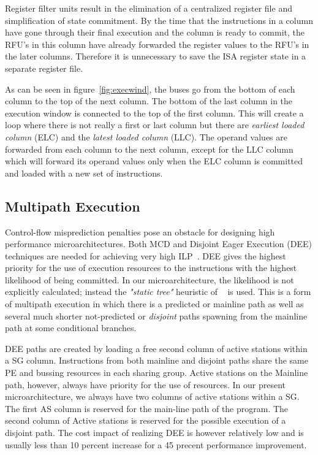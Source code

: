 \documentclass[10pt,twocolumn]{IEEEtran}
\begin{document}
Register filter units result in the elimination of a centralized
register file and simplification of state commitment.  By the time that
the instructions in a column have gone through their final execution
and the column is ready to commit, the RFU's in this column have
already forwarded the register values to the RFU's in the later
columns.  Therefore it is unnecessary to save the ISA register state in
a separate register file.

As can be seen in figure~\ref{fig:execwind}, the buses go from the
bottom of each column to the top of the next column.  The bottom of the
last column in the execution window is connected to the top of the
first column.  This will create a loop where there is not really a
first or last column but there are \emph{earliest loaded column} (ELC)
and the \emph{latest loaded column} (LLC).  The operand values are
forwarded from each column to the next column, except for the LLC
column which will forward its operand values only when the ELC column
is committed and loaded with a new set of instructions.

\subsection {Multipath Execution}

Control-flow misprediction penalties pose an obstacle for designing
high performance microarchitectures.  Both MCD and Disjoint Eager
Execution (DEE) techniques are 
needed for achieving very high ILP~\cite{Uht95}.
DEE gives the highest priority for the use of execution
resources to the instructions with the highest likelihood of being
committed.  In our microarchitecture, the likelihood is not explicitly
calculated; instead the \emph{"static tree"} heuristic of ~\cite{Uht95} is
used.  This is a form of multipath execution in which there is a
predicted or mainline path as well as several much shorter
not-predicted or \emph{disjoint} paths spawning from the mainline path
at some conditional branches.

DEE paths are created by loading a free second column of active
stations within a SG column.  Instructions from both mainline and
disjoint paths share the same PE and bussing resources in each sharing
group.  Active stations on the Mainline path, however, always have
priority for the use of resources.  In our present microarchitecture,
we always have two columns of active stations within a SG. 
The first AS
column is reserved for the main-line path of the program. The second
column of Active stations is reserved for the possible execution of a
disjoint path.  The cost impact of realizing DEE is however relatively
low and is usually less than 10 percent increase for a 45 precent
performance improvement.
\end{document}

